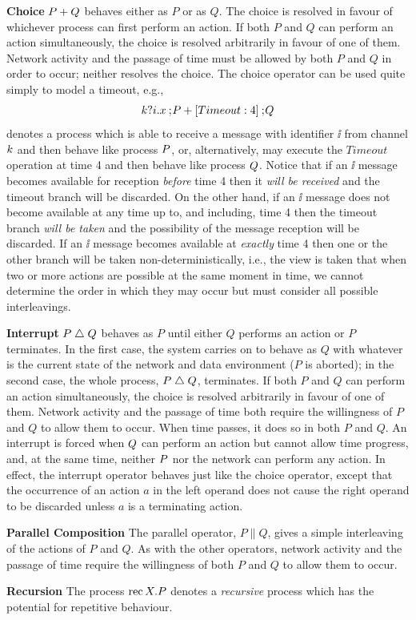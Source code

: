 \begin{trivlist}
\item[{\bf Choice}]
$P \choice Q$ behaves either as $P$ or as $Q$. The choice is resolved
in favour of whichever process can first perform an action. If both
$P$ and $Q$ can perform an action simultaneously, the choice is
resolved arbitrarily in favour of one of them. Network activity and
the passage of time must be allowed by both $P$ and $Q$ in order to
occur; neither resolves the choice. The choice operator can be used 
quite simply to model a timeout, e.g.,
\[ \kk?\ii.\xx \sq \P \choice [Timeout:4] \sq \Q \]
denotes a process which is able to receive a message with identifier
$\ii$ from channel $\kk$ and then behave like process $\P$, or, alternatively,
may execute the $Timeout$ operation at time 4 and then behave like process
$\Q$. Notice that if an $\ii$ message becomes available for reception
\emph{before} time 4 then it \emph{will be received} and the timeout 
branch will be discarded. On the other hand, if an $\ii$ message does not
become available at any time up to, and including, time 4 then the timeout
branch \emph{will be taken} and the possibility of the message reception
will be discarded. If an $\ii$ message becomes available at \emph{exactly}
time 4 then one or the other branch will be taken non-deterministically, i.e.,
the view is taken that when two or more actions are possible at the same
moment in time, we cannot determine the order in which they may
occur but must consider all possible interleavings.   

\item[{\bf Interrupt}]
$P \interrupt Q$ behaves as $P$ until either $Q$ performs an action or
$P$ terminates. In the first case, the system carries on to behave as
$Q$ with whatever is the current state of the network and data
environment ($P$ is aborted); in the second case, the whole process,
$P \interrupt Q$, terminates. If both $P$ and $Q$ can perform an
action simultaneously, the choice is resolved arbitrarily in favour of
one of them. Network activity and the passage of time both require the
willingness of $P$ and $Q$ to allow them to occur. When time passes,
it does so in both $P$ and $Q$. An interrupt is forced when $\Q$ can
perform an action but cannot allow time progress, and, at the same
time, neither $\P$ nor the network can perform any action. In effect,
the interrupt operator behaves just like the choice operator, except that
the occurrence of an action $a$ in the left operand does not cause the right
operand to be discarded unless $a$ is a terminating action.

\item[{\bf Parallel Composition}]
The parallel operator, $P \parallel Q$, gives a simple interleaving
of the actions of $P$ and $Q$. As with the other operators, network
activity and the passage of time require the willingness of both
$P$ and $Q$ to allow them to occur.

\item[{\bf Recursion}]
The process $\rec X.\P$ denotes a \emph{recursive} process which has the
potential for repetitive behaviour.
\end{trivlist}

